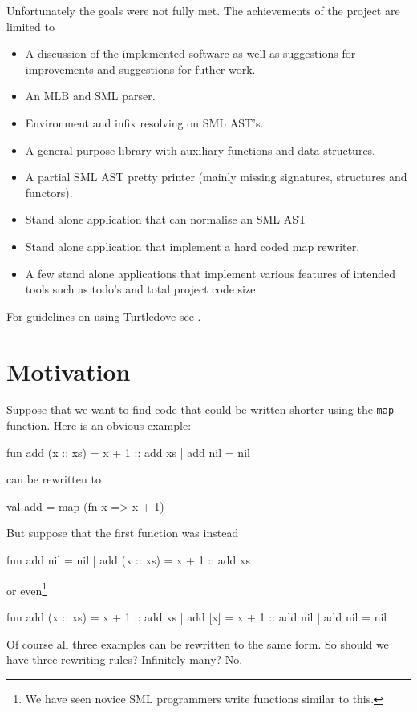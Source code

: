 Unfortunately the goals were not fully met. The achievements of the project
are limited to

\begin{itemize}

\item A discussion of the implemented software as well as suggestions for
improvements and suggestions for futher work.
\item An MLB and SML parser.
\item Environment and infix resolving on SML AST's.
\item A general purpose library with auxiliary functions and data structures.
\item A partial SML AST pretty printer (mainly missing signatures, structures
  and functors).
\item Stand alone application that can normalise an SML AST
\item Stand alone application that implement a hard coded map rewriter.
\item A few stand alone applications that implement various features of intended
  tools such as todo's and total project code size.
\end{itemize}

For guidelines on using Turtledove see .

\section{Motivation}
\label{sec:motivation}
Suppose that we want to find code that could be written shorter using the
\texttt{map} function.
Here is an obvious example:
\begin{sml}
fun add (x :: xs) = x + 1 :: add xs
  | add nil       = nil
\end{sml}
can be rewritten to
\begin{sml}
val add = map (fn x => x + 1)
\end{sml}
But suppose that the first function was instead
\begin{sml}
fun add nil       = nil
  | add (x :: xs) = x + 1 :: add xs
\end{sml}
or even\footnote{We have seen novice SML programmers write functions similar to
  this.}
\begin{sml}
fun add (x :: xs) = x + 1 :: add xs
  | add [x]       = x + 1 :: add nil
  | add nil       = nil
\end{sml}
Of course all three examples can be rewritten to the same form. So should we
have three rewriting rules? Infinitely many? No.


